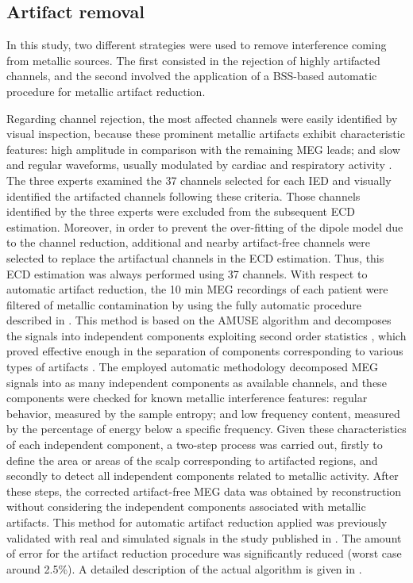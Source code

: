 \subsection{Artifact removal}

In this study, two different strategies were used to remove interference coming from metallic sources. The first consisted in the rejection of highly artifacted channels, and the second involved the application of a BSS-based automatic procedure for metallic artifact reduction.

Regarding channel rejection, the most affected channels were easily identified by visual inspection, because these prominent metallic artifacts exhibit characteristic features: high amplitude in comparison with the remaining MEG leads; and slow and regular waveforms, usually modulated by cardiac and respiratory activity \citep{Hillebrand2013}. The three experts examined the 37 channels selected for each IED and visually identified the artifacted channels following these criteria. Those channels identified by the three experts were excluded from the subsequent ECD estimation. Moreover, in order to prevent the over-fitting of the dipole model due to the channel reduction, additional and nearby artifact-free channels were selected to replace the artifactual channels in the ECD estimation. Thus, this ECD estimation was always performed using 37 channels. With respect to automatic artifact reduction, the 10 min MEG recordings of each patient were filtered of metallic contamination by using the fully automatic procedure described in \citep{Migliorelli2015}. This method is based on the AMUSE algorithm and decomposes the signals into independent components exploiting second order statistics \citep{Tong1991}, which proved effective enough in the separation of components corresponding to various types of artifacts \citep{Escudero2010}. The employed automatic methodology decomposed MEG signals into as many independent components as available channels, and these components were checked for known metallic interference features: regular behavior, measured by the sample entropy; and low frequency content, measured by the percentage of energy below a specific frequency. Given these characteristics of each independent component, a two-step process was carried out, firstly to define the area or areas of the scalp corresponding to artifacted regions, and secondly to detect all independent components related to metallic activity. After these steps, the corrected artifact-free MEG data was obtained by reconstruction without considering the independent components associated with metallic artifacts. This method for automatic artifact reduction applied was previously validated with real and simulated signals in the study published in \citep{Migliorelli2015}. The amount of error for the artifact reduction procedure was significantly reduced (worst case around 2.5\%). A detailed description of the actual algorithm is given in \citep{Migliorelli2015}.

